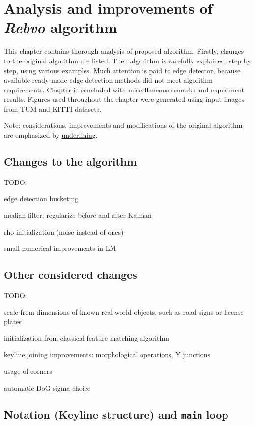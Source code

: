 \chapter{Analysis and improvements of \textit{Rebvo} algorithm}
\label{cha:intro2}

This chapter contains thorough analysis of proposed algorithm. Firstly, changes to the original algorithm are listed. Then algorithm is carefully explained, step by step, using various examples. Much attention is paid to edge detector, because available ready-made edge detection methods did not meet algorithm requirements. Chapter is concluded with miscellaneous remarks and experiment results. Figures used throughout the chapter were generated using input images from TUM \cite{tum} and KITTI \cite{kitti} datasets.

Note: considerations, improvements and modifications of the original algorithm are emphasized by \underline{underlining}.

\section{Changes to the algorithm}
\label{sec:changes}

TODO:

edge detection bucketing

median filter; regularize before and after Kalman

rho initialization (noise instead of ones)

small numerical improvements in LM


\section{Other considered changes}
\label{sec:rejected}

TODO:

scale from dimensions of known real-world objects, such as road signs or license plates

initialization from classical feature matching algorithm

keyline joining improvements: morphological operations, Y junctions

usage of corners

automatic DoG sigma choice


\section{Notation (Keyline structure) and {\tt main} loop}

